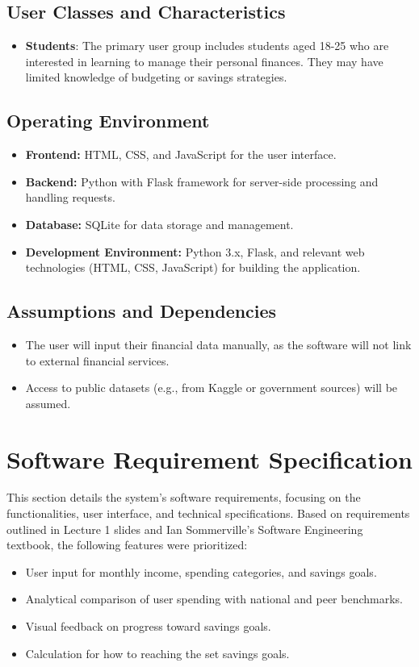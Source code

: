 \documentclass{article}
\begin{document}
\subsection{User Classes and Characteristics}
\begin{itemize}
    \item \textbf{Students}: The primary user group includes students aged 18-25 who are interested in learning to manage their personal finances. They may have limited knowledge of budgeting or savings strategies.
\end{itemize}

\subsection{Operating Environment}
\begin{itemize}
    \item \textbf{Frontend:} HTML, CSS, and JavaScript for the user interface.  
    \item \textbf{Backend:} Python with Flask framework for server-side processing and handling requests.  
    \item \textbf{Database:} SQLite for data storage and management.  
    \item \textbf{Development Environment:} Python 3.x, Flask, and relevant web technologies (HTML, CSS, JavaScript) for building the application.  
\end{itemize}

\subsection{Assumptions and Dependencies}
\begin{itemize}
    \item The user will input their financial data manually, as the software will not link to external financial services.
    \item Access to public datasets (e.g., from Kaggle or government sources) will be assumed.
\end{itemize}

\section{Software Requirement Specification}
This section details the system’s software requirements, focusing on the functionalities, user interface, and technical specifications. Based on requirements outlined in Lecture 1 slides and Ian Sommerville's Software Engineering textbook, the following features were prioritized: 
\begin{itemize} 
\item User input for monthly income, spending categories, and savings goals. 
\item Analytical comparison of user spending with national and peer benchmarks. 
\item Visual feedback on progress toward savings goals. 
\item Calculation for how to reaching the set savings goals. 
\end{itemize}
\end{document}

